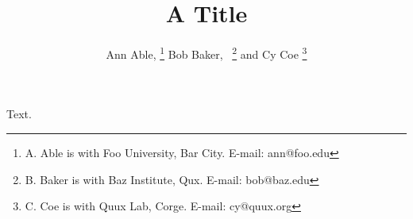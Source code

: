 \documentclass[journal]{IEEEtran}
\begin{document}
\title{A Title}
\author{Ann Able, %
  \thanks{A. Able is with Foo University, Bar City. E-mail: ann@foo.edu}%
  Bob Baker,~ %
  \thanks{B. Baker is with Baz Institute, Qux. E-mail: bob@baz.edu}%
  and Cy Coe %
  \thanks{C. Coe is with Quux Lab, Corge. E-mail: cy@quux.org}}
\maketitle
Text.
\end{document}
